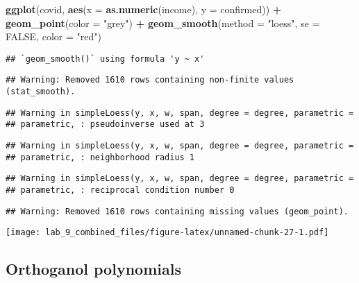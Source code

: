 \documentclass[]{article}
\newenvironment{Shaded}{\begin{snugshade}}{\end{snugshade}}
\newcommand{\KeywordTok}[1]{\textcolor[rgb]{0.13,0.29,0.53}{\textbf{#1}}}
\newcommand{\DataTypeTok}[1]{\textcolor[rgb]{0.13,0.29,0.53}{#1}}
\newcommand{\StringTok}[1]{\textcolor[rgb]{0.31,0.60,0.02}{#1}}
\newcommand{\OtherTok}[1]{\textcolor[rgb]{0.56,0.35,0.01}{#1}}
\newcommand{\OperatorTok}[1]{\textcolor[rgb]{0.81,0.36,0.00}{\textbf{#1}}}
\newcommand{\NormalTok}[1]{#1}
\begin{document}
\begin{Shaded}
\begin{Highlighting}[]
\KeywordTok{ggplot}\NormalTok{(covid, }\KeywordTok{aes}\NormalTok{(}\DataTypeTok{x =} \KeywordTok{as.numeric}\NormalTok{(income), }\DataTypeTok{y =}\NormalTok{ confirmed)) }\OperatorTok{+}
\StringTok{  }\KeywordTok{geom_point}\NormalTok{(}\DataTypeTok{color =} \StringTok{"grey"}\NormalTok{) }\OperatorTok{+}
\StringTok{  }\KeywordTok{geom_smooth}\NormalTok{(}\DataTypeTok{method =} \StringTok{"loess"}\NormalTok{, }\DataTypeTok{se =} \OtherTok{FALSE}\NormalTok{, }\DataTypeTok{color =} \StringTok{"red"}\NormalTok{)}
\end{Highlighting}
\end{Shaded}

\begin{verbatim}
## `geom_smooth()` using formula 'y ~ x'
\end{verbatim}

\begin{verbatim}
## Warning: Removed 1610 rows containing non-finite values (stat_smooth).
\end{verbatim}

\begin{verbatim}
## Warning in simpleLoess(y, x, w, span, degree = degree, parametric =
## parametric, : pseudoinverse used at 3
\end{verbatim}

\begin{verbatim}
## Warning in simpleLoess(y, x, w, span, degree = degree, parametric =
## parametric, : neighborhood radius 1
\end{verbatim}

\begin{verbatim}
## Warning in simpleLoess(y, x, w, span, degree = degree, parametric =
## parametric, : reciprocal condition number 0
\end{verbatim}

\begin{verbatim}
## Warning: Removed 1610 rows containing missing values (geom_point).
\end{verbatim}

\texttt{[image: lab\_9\_combined\_files/figure-latex/unnamed-chunk-27-1.pdf]}

\subsection{Orthoganol polynomials}\label{orthoganol-polynomials}
\end{document}
